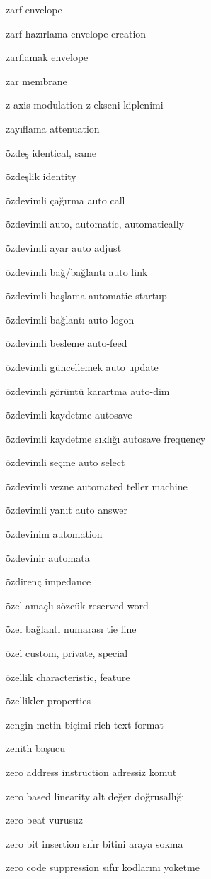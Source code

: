 \documentclass[12pt,fleqn]{article}\usepackage{../../common}
\begin{document}
zarf envelope

zarf hazırlama envelope creation

zarflamak envelope

zar membrane

z axis modulation z ekseni kiplenimi

zayıflama attenuation

özdeş identical, same

özdeşlik identity

özdevimli çağırma auto call

özdevimli auto, automatic, automatically

özdevimli ayar auto adjust

özdevimli bağ/bağlantı auto link

özdevimli başlama automatic startup

özdevimli bağlantı auto logon

özdevimli besleme auto-feed

özdevimli güncellemek auto update

özdevimli görüntü karartma auto-dim

özdevimli kaydetme autosave

özdevimli kaydetme sıklığı autosave frequency

özdevimli seçme auto select

özdevimli vezne automated teller machine

özdevimli yanıt auto answer

özdevinim automation

özdevinir automata

özdirenç impedance

özel amaçlı sözcük reserved word

özel bağlantı numarası tie line

özel custom, private, special

özellik characteristic, feature

özellikler properties

zengin metin biçimi rich text format

zenith başucu

zero address instruction adressiz komut

zero based linearity alt değer doğrusallığı

zero beat vurusuz

zero bit insertion sıfır bitini araya sokma

zero code suppression sıfır kodlarını yoketme
\end{document}
